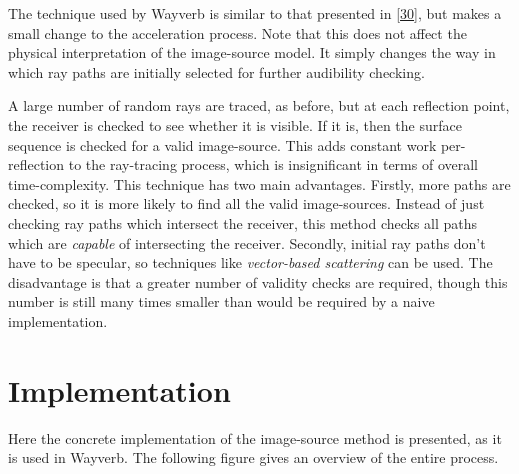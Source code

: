 \documentclass[]{scrreprt}
\begin{document}
The technique used by Wayverb is similar to that presented in
{[}\protect\hyperlink{ref-vorlanderux5fauralization:ux5f2007}{30}{]},
but makes a small change to the acceleration process. Note that this
does not affect the physical interpretation of the image-source model.
It simply changes the way in which ray paths are initially selected for
further audibility checking.

A large number of random rays are traced, as before, but at each
reflection point, the receiver is checked to see whether it is visible.
If it is, then the surface sequence is checked for a valid image-source.
This adds constant work per-reflection to the ray-tracing process, which
is insignificant in terms of overall time-complexity. This technique has
two main advantages. Firstly, more paths are checked, so it is more
likely to find all the valid image-sources. Instead of just checking ray
paths which intersect the receiver, this method checks all paths which
are \emph{capable} of intersecting the receiver. Secondly, initial ray
paths don't have to be specular, so techniques like \emph{vector-based
scattering} can be used. The disadvantage is that a greater number of
validity checks are required, though this number is still many times
smaller than would be required by a naive implementation.

\section{Implementation}\label{implementation}

Here the concrete implementation of the image-source method is
presented, as it is used in Wayverb. The following figure
\text{(\ref{fig:image_source_process})} gives an overview of the entire
process.
\end{document}

